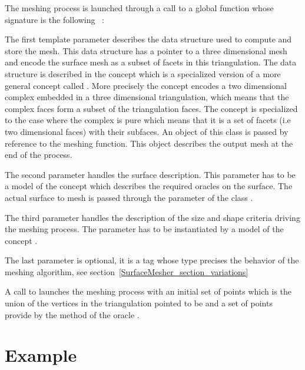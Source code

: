 The meshing process is launched through a call to a global function
whose signature is the following ~:


The first template parameter  describes 
the data structure
used to compute and store the mesh. This data structure
has a pointer to a three dimensional mesh and encode
the surface mesh as a subset of facets in this triangulation.
The data structure is described in the concept
 which is a specialized version
of a more general concept called  .
More precisely the concept 
encodes a two dimensional complex embedded  in a three dimensional
triangulation, which means that the complex  faces form a subset
of the triangulation faces. The concept  is 
specialized to the case where the complex is pure which means that it
is a set of facets (i.e two dimensional faces) with  their subfaces.
An object of this class is passed by reference to the meshing
function. This object describes the output mesh at the end of the
process.

The second parameter  handles the surface
description. This parameter  has to be a model of
the concept  which describes the
required oracles on the surface. The actual surface to mesh is
passed through the parameter  of the class .

The third parameter handles the description of the size and shape
criteria driving the meshing process. The parameter 
has to be instantiated by a model of the concept .


The last parameter is optional, it is a tag 
whose type precises the behavior of the
meshing algorithm, see section~\ref{SurfaceMesher_section_variations}

A call to 
 launches 
the meshing process with an initial 
set of points which is the union
of the vertices in the triangulation pointed to be 
and a set of points provide by the  method 
of the oracle .


\section{Example}
\label{SurfaceMesher_section_example}

